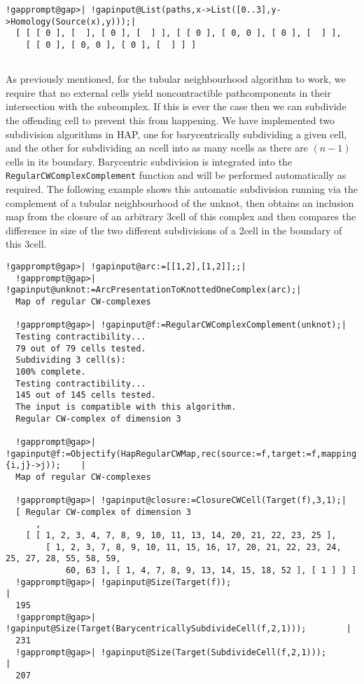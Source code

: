 \documentclass[a4paper,11pt]{report}
\begin{document}
{{\begin{Verbatim}[commandchars=!@|,fontsize=\small,frame=single,label=Example]
  !gapprompt@gap>| !gapinput@List(paths,x->List([0..3],y->Homology(Source(x),y)));|
  [ [ [ 0 ], [  ], [ 0 ], [  ] ], [ [ 0 ], [ 0, 0 ], [ 0 ], [  ] ], 
    [ [ 0 ], [ 0, 0 ], [ 0 ], [  ] ] ]
  
\end{Verbatim}
 As previously mentioned, for the tubular neighbourhood algorithm to work, we
require that no external cells yield non\texttt{}contractible
path\texttt{}components in their intersection with the subcomplex.
If this is ever the case then we can subdivide the offending cell to prevent
this from happening. We have implemented two subdivision algorithms in HAP,
one for barycentrically subdividing a given cell, and the other for
subdividing an $n$\texttt{}cell into as many $n$\texttt{}cells as there are $(n-1)$\texttt{}cells in its boundary. Barycentric subdivision is
integrated into the \texttt{RegularCWComplexComplement} function and will be performed automatically as required. The following
example shows this automatic subdivision running via the complement of a
tubular neighbourhood of the unknot, then obtains an inclusion map from the
closure of an arbitrary $3$\texttt{}cell of this complex and then compares the difference in
size of the two different subdivisions of a 2\texttt{}cell in the
boundary of this $3$\texttt{}cell. 
\begin{Verbatim}[commandchars=!@|,fontsize=\small,frame=single,label=Example]
  !gapprompt@gap>| !gapinput@arc:=[[1,2],[1,2]];;|
  !gapprompt@gap>| !gapinput@unknot:=ArcPresentationToKnottedOneComplex(arc);|
  Map of regular CW-complexes
  
  !gapprompt@gap>| !gapinput@f:=RegularCWComplexComplement(unknot);|
  Testing contractibility...
  79 out of 79 cells tested.
  Subdividing 3 cell(s):
  100% complete. 
  Testing contractibility...
  145 out of 145 cells tested.
  The input is compatible with this algorithm.
  Regular CW-complex of dimension 3
  
  !gapprompt@gap>| !gapinput@f:=Objectify(HapRegularCWMap,rec(source:=f,target:=f,mapping:={i,j}->j));    |
  Map of regular CW-complexes
  
  !gapprompt@gap>| !gapinput@closure:=ClosureCWCell(Target(f),3,1);|
  [ Regular CW-complex of dimension 3
      , 
    [ [ 1, 2, 3, 4, 7, 8, 9, 10, 11, 13, 14, 20, 21, 22, 23, 25 ], 
        [ 1, 2, 3, 7, 8, 9, 10, 11, 15, 16, 17, 20, 21, 22, 23, 24, 25, 27, 28, 55, 58, 59, 
            60, 63 ], [ 1, 4, 7, 8, 9, 13, 14, 15, 18, 52 ], [ 1 ] ] ]
  !gapprompt@gap>| !gapinput@Size(Target(f));                                          |
  195
  !gapprompt@gap>| !gapinput@Size(Target(BarycentricallySubdivideCell(f,2,1)));        |
  231
  !gapprompt@gap>| !gapinput@Size(Target(SubdivideCell(f,2,1)));        |
  207
  

\end{Verbatim}}}
\end{document}
